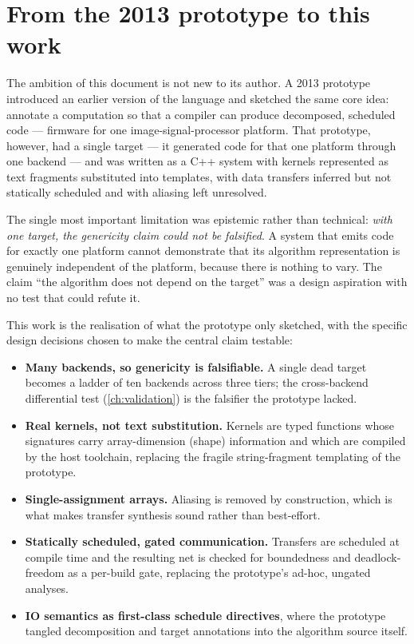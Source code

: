\section{From the 2013 prototype to this work}\label{sec:pa-v1}

The ambition of this document is not new to its author. A 2013
prototype~\cite{mped2013nuc} introduced an earlier version of the \nuclang{} language
and sketched the same core idea: annotate a computation so that a compiler can
produce decomposed, scheduled code --- firmware for one image-signal-processor
platform. That prototype, however, had a single target --- it generated code for
that one platform through one backend --- and was written as a C++ system with
kernels represented as text fragments substituted into templates, with data
transfers inferred but not statically scheduled and with aliasing left
unresolved.

The single most important limitation was epistemic rather than technical:
\emph{with one target, the genericity claim could not be falsified}. A system
that emits code for exactly one platform cannot demonstrate that its algorithm
representation is genuinely independent of the platform, because there is nothing
to vary. The claim ``the algorithm does not depend on the target'' was a design
aspiration with no test that could refute it.

This work is the realisation of what the prototype only sketched, with the
specific design decisions chosen to make the central claim testable:

\begin{itemize}[leftmargin=*]
  \item \textbf{Many backends, so genericity is falsifiable.} A single dead
        target becomes a ladder of ten backends across three tiers; the
        cross-backend differential test (\cref{ch:validation}) is the falsifier
        the prototype lacked.
  \item \textbf{Real kernels, not text substitution.} Kernels are typed functions
        whose signatures carry array-dimension (shape) information and which are
        compiled by the host toolchain, replacing the fragile string-fragment
        templating of the prototype.
  \item \textbf{Single-assignment arrays.} Aliasing is removed by construction,
        which is what makes transfer synthesis sound rather than best-effort.
  \item \textbf{Statically scheduled, gated communication.} Transfers are
        scheduled at compile time and the resulting net is checked for
        boundedness and deadlock-freedom as a per-build gate, replacing the
        prototype's ad-hoc, ungated analyses.
  \item \textbf{IO semantics as first-class schedule directives}, where the
        prototype tangled decomposition and target annotations into the
        algorithm source itself.
\end{itemize}

